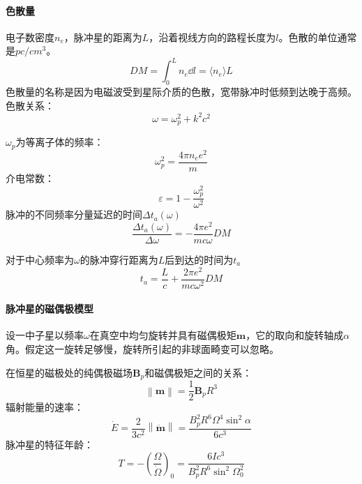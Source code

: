 \paragraph{色散量}
电子数密度$n_{e}$，脉冲星的距离为$L$，沿着视线方向的路程长度为$l$。色散的单位通常是$pc/cm^3$。
\begin{equation}
	DM=\int_{0}^{L}n_{e}\dd l=\langle n_{e}\rangle L
\end{equation}
色散量的名称是因为电磁波受到星际介质的色散，宽带脉冲时低频到达晚于高频。
色散关系：
\begin{equation}
	\omega=\omega_{p}^2+k^2c^2
\end{equation}

$\omega_{p}$为等离子体的频率：
\begin{equation}
	\omega_{p}^2=\frac{4\pi n_{e}e^2}{m}
\end{equation}
介电常数：
\begin{equation}
	\varepsilon=1-\frac{\omega_{p}^2}{\omega^2}
\end{equation}
脉冲的不同频率分量延迟的时间$\Delta t_{a}(\omega)$
\begin{equation}
	\frac{\Delta t_{a}(\omega)}{\Delta \omega}=-\frac{4\pi e^2}{mc\omega}DM
\end{equation}

对于中心频率为$\omega$的脉冲穿行距离为$L$后到达的时间为$t_{a}$
\begin{equation}
	t_{a}=\frac{L}{c}+\frac{2\pi e^2}{mc\omega^2}DM
\end{equation}
\paragraph{脉冲星的磁偶极模型}
设一中子星以频率$\omega$在真空中均匀旋转并具有磁偶极矩$\boldsymbol{m}$，它的取向和旋转轴成$\alpha$角。假定这一旋转足够慢，旋转所引起的非球面畸变可以忽略。

在恒星的磁极处的纯偶极磁场$\boldsymbol{B}_{p}$和磁偶极矩之间的关系：
\begin{equation}
	\left\|\boldsymbol{m}\right\|=\frac{1}{2}\boldsymbol{B}_{p}R^3
\end{equation}
辐射能量的速率：
\begin{equation}
	\dot{E}=\frac{2}{3c^2}\left\|\ddot{\boldsymbol{m}}\right\|=\frac{B_{p}^2R^6\Omega^4\sin^2\alpha}{6c^3}
\end{equation}
脉冲星的特征年龄：
\begin{equation}
	T=-\left(\frac{\Omega}{\dot{\Omega}}\right)_{0}=\frac{6Ic^3}{B_{p}^2R^6\sin^2\Omega_{0}^2}
\end{equation}

